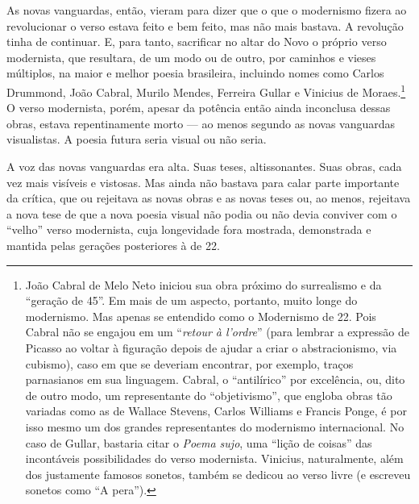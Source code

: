 As novas vanguardas, então, vieram para
dizer que o que o modernismo ﬁzera ao revolucionar o verso estava
feito e bem feito, mas não mais bastava. A revolução tinha de continuar.
E, para tanto, sacriﬁcar no altar do Novo o próprio verso modernista,
que resultara, de um modo ou de outro, por caminhos e vieses
múltiplos, na maior e melhor poesia brasileira, incluindo nomes como
Carlos Drummond, João Cabral, Murilo Mendes, Ferreira Gullar e Vinicius
de Moraes.\footnote{João Cabral de Melo Neto iniciou sua obra próximo do surrealismo e da ``geração de 45''. Em mais de um aspecto, portanto, muito longe do modernismo. Mas
apenas se entendido como o Modernismo de 22. Pois Cabral não se
engajou em um ``\emph{retour à l'ordre}'' (para lembrar a expressão de
Picasso ao voltar à ﬁguração depois de ajudar a criar o abstracionismo, via cubismo), caso em que se deveriam encontrar, por exemplo,
traços parnasianos em sua linguagem. Cabral, o ``antilírico'' por
excelência, ou, dito de outro modo, um representante do
``objetivismo'', que engloba obras tão variadas como as de Wallace
Stevens, Carlos Williams e Francis Ponge, é por isso mesmo um dos
grandes representantes do modernismo internacional. No caso de Gullar,
bastaria citar o \emph{Poema sujo}, uma ``lição de coisas'' das
incontáveis possibilidades do verso modernista. Vinicius, naturalmente,
além dos justamente famosos sonetos, também se dedicou ao verso livre (e
escreveu sonetos como ``A pera'').} O verso modernista, porém, apesar da potência então ainda inconclusa dessas obras, estava repentinamente morto --- ao menos
segundo as novas vanguardas visualistas. A poesia
futura seria visual ou não seria.

A voz das novas vanguardas era alta. Suas teses, altissonantes. Suas
obras, cada vez mais visíveis e vistosas. Mas ainda não bastava para calar parte importante da crítica, que ou rejeitava as novas obras e as
novas teses ou, ao menos, rejeitava a nova tese de que a nova poesia
visual não podia ou não devia conviver com o ``velho'' verso modernista,
cuja longevidade fora mostrada, demonstrada e mantida pelas gerações posteriores à
de 22.

